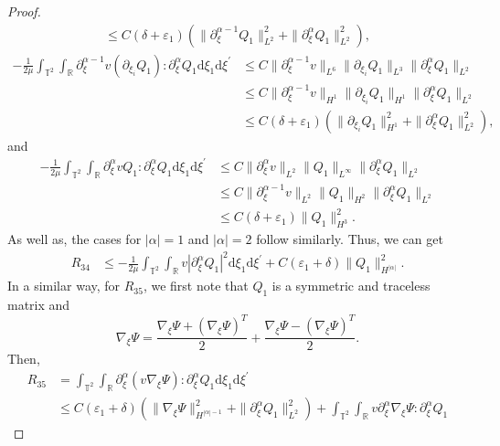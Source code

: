 \documentclass[10pt,reqno]{amsart}
\numberwithin{equation}{section}
\newcommand{\dif}{\mathrm{d}}
\begin{document}
\begin{proof}
\begin{align*}
\le C(\delta+\varepsilon_1)(\|\partial_\xi^{\alpha-1} Q_1\|_{L^2}^2+\|\partial_\xi^\alpha Q_1\|_{L^2}^2),
\end{align*}
\begin{align*}
-\frac{1}{2\mu}\int_{\mathbb{T}^2}\int_{\mathbb{R}}\partial_\xi^{\alpha-1} v \left(\partial _{\xi_i}Q_1\right):\partial_\xi^\alpha Q_1\dif \xi_1\dif \xi^{\prime}&
\le C\|\partial_\xi^{\alpha-1} v\|_{L^6}\|\partial _{\xi_i}Q_1\|_{L^3}\|\partial_\xi^\alpha Q_1\|_{L^2}\\
&\le C\|\partial_\xi^{\alpha-1} v\|_{H^1}\|\partial _{\xi_i}Q_1\|_{H^1}\|\partial_\xi^\alpha Q_1\|_{L^2}\\
&\le C(\delta+\varepsilon_1)(\|\partial_{\xi_i} Q_1\|_{H^1}^2+\|\partial_\xi^\alpha Q_1\|_{L^2}^2),
\end{align*}
and
\begin{align*}
-\frac{1}{2\mu}\int_{\mathbb{T}^2}\int_{\mathbb{R}}\partial_\xi^\alpha v Q_1:\partial_\xi^\alpha Q_1\dif \xi_1\dif \xi^{\prime}&\le C\|\partial_\xi^{\alpha} v\|_{L^2}\|Q_1\|_{L^\infty}\|\partial_\xi^\alpha Q_1\|_{L^2}\\
&\le C\|\partial_\xi^{\alpha-1} v\|_{L^2}\|Q_1\|_{H^2}\|\partial_\xi^\alpha Q_1\|_{L^2}\\
&\le C(\delta+\varepsilon_1)\| Q_1\|_{H^3}^2.
\end{align*}
As well as, the cases for $|\alpha|=1$ and $|\alpha|=2$ follow similarly. Thus, we can get
\begin{equation}\label{r34}
\begin{aligned}
R_{34}&\le -\frac{1}{2\mu}\int_{\mathbb{T}^2}\int_{\mathbb{R}}
 v|\partial_\xi^\alpha Q_1|^2\dif \xi_1\dif \xi^{\prime}+C(\varepsilon_1+\delta)\|Q_1\|_{H^{|\alpha|}}^2.
\end{aligned}
\end{equation}
In a similar way, for $R_{35}$, we first note that $Q_1$ is a symmetric and traceless matrix and
\[
\nabla_\xi\Psi=\frac{\nabla_\xi\Psi+(\nabla_\xi\Psi)^T}{2}+\frac{\nabla_\xi\Psi-(\nabla_\xi\Psi)^T}{2}.
\]
Then,
\begin{equation}\label{r35}
\begin{aligned}
R_{35}&=\int_{\mathbb{T}^2}\int_{\mathbb{R}}
\partial_\xi^\alpha \left(v \nabla_\xi\Psi\right):\partial_\xi^\alpha Q_1\dif \xi_1\dif \xi^{\prime}\\
&\le  C(\varepsilon_1+\delta)\left(\|\nabla_\xi\Psi\|_{H^{|\alpha|-1}}^2+
   \|\partial_\xi^\alpha Q_1\|_{L^2}^2\right)
 +\int_{\mathbb{T}^2}\int_{\mathbb{R}}
v\partial_\xi^\alpha\nabla_\xi\Psi:\partial_\xi^\alpha Q_1

\end{aligned}
\end{equation}
\end{proof}
\end{document}
